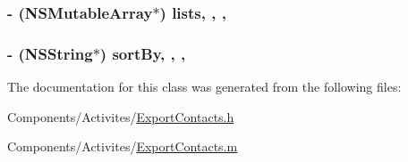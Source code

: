 \hypertarget{interface_export_contacts_a911744dfb12c60e9bb176a6b71fea829}{
\subsubsection[{lists}]{\setlength{\rightskip}{0pt plus 5cm}-\/ (N\-S\-Mutable\-Array$\ast$) lists\hspace{0.3cm}{\ttfamily [read]}, {\ttfamily [write]}, {\ttfamily [nonatomic]}, {\ttfamily [strong]}}}\label{interface_export_contacts_a911744dfb12c60e9bb176a6b71fea829}
\hypertarget{interface_export_contacts_a0f38be8806e1582be9980cd84e446081}{
\subsubsection[{sort\-By}]{\setlength{\rightskip}{0pt plus 5cm}-\/ (N\-S\-String$\ast$) sort\-By\hspace{0.3cm}{\ttfamily [read]}, {\ttfamily [write]}, {\ttfamily [nonatomic]}, {\ttfamily [strong]}}}\label{interface_export_contacts_a0f38be8806e1582be9980cd84e446081}


The documentation for this class was generated from the following files\-:\begin{DoxyCompactItemize}
\item 
Components/\-Activites/\hyperlink{_export_contacts_8h}{Export\-Contacts.\-h}\item 
Components/\-Activites/\hyperlink{_export_contacts_8m}{Export\-Contacts.\-m}\end{DoxyCompactItemize}

